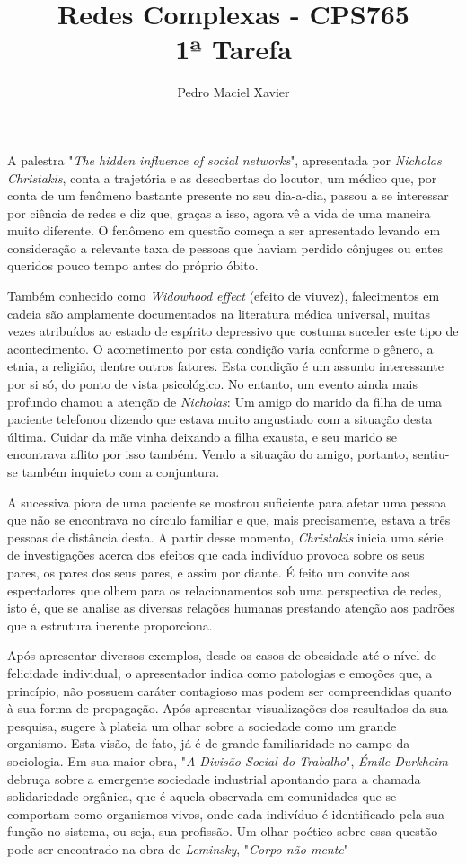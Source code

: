 \documentclass{homework}
\title{Redes Complexas - CPS765 \\[1ex]%
1ª Tarefa}
\author{Pedro Maciel Xavier}
\begin{document}
    \smaketitle %

    A palestra "\textit{The hidden influence of social networks}", apresentada por \textit{Nicholas Christakis}, conta a trajetória e as descobertas do locutor, um médico que, por conta de um fenômeno bastante presente no seu dia-a-dia, passou a se interessar por ciência de redes e diz que, graças a isso, agora vê a vida de uma maneira muito diferente. O fenômeno em questão começa a ser apresentado levando em consideração a relevante taxa de pessoas que haviam perdido cônjuges ou entes queridos pouco tempo antes do próprio óbito.\par
    Também conhecido como \textit{Widowhood effect} (efeito de viuvez), falecimentos em cadeia são amplamente documentados na literatura médica universal, muitas vezes atribuídos ao estado de espírito depressivo que costuma suceder este tipo de acontecimento. O acometimento por esta condição varia conforme o gênero, a etnia, a religião, dentre outros fatores\cite{wilcox:03}\cite{abel:09}. Esta condição é um assunto interessante por si só, do ponto de vista psicológico. No entanto, um evento ainda mais profundo chamou a atenção de \textit{Nicholas}: Um amigo do marido da filha de uma paciente telefonou dizendo que estava muito angustiado com a situação desta última. Cuidar da mãe vinha deixando a filha exausta, e seu marido se encontrava aflito por isso também. Vendo a situação do amigo, portanto, sentiu-se também inquieto com a conjuntura.\par
    A sucessiva piora de uma paciente se mostrou suficiente para afetar uma pessoa que não se encontrava no círculo familiar e que, mais precisamente, estava a três pessoas de distância desta. A partir desse momento, \textit{Christakis} inicia uma série de investigações acerca dos efeitos que cada indivíduo provoca sobre os seus pares, os pares dos seus pares, e assim por diante. É feito um convite aos espectadores que olhem para os relacionamentos sob uma perspectiva de redes, isto é, que se analise as diversas relações humanas prestando atenção aos padrões que a estrutura inerente proporciona.%
    \par
	Após apresentar diversos exemplos, desde os casos de obesidade até o nível de felicidade individual, o apresentador indica como patologias e emoções que, a princípio, não possuem caráter contagioso mas podem ser compreendidas quanto à sua forma de propagação. Após apresentar visualizações dos resultados da sua pesquisa, sugere à plateia um olhar sobre a sociedade como um grande organismo. Esta visão, de fato, já é de grande familiaridade no campo da sociologia. Em sua maior obra, "\textit{A Divisão Social do Trabalho}", \textit{Émile Durkheim} debruça sobre a emergente sociedade industrial apontando para a chamada solidariedade orgânica, que é aquela observada em comunidades que se comportam como organismos vivos, onde cada indivíduo é identificado pela sua função no sistema, ou seja, sua profissão\cite{durkheim:19.97}. Um olhar poético sobre essa questão pode ser encontrado na obra de \textit{Leminsky}, "\textit{Corpo não mente}"\cite{leminsky:19.97}%
\end{document}
